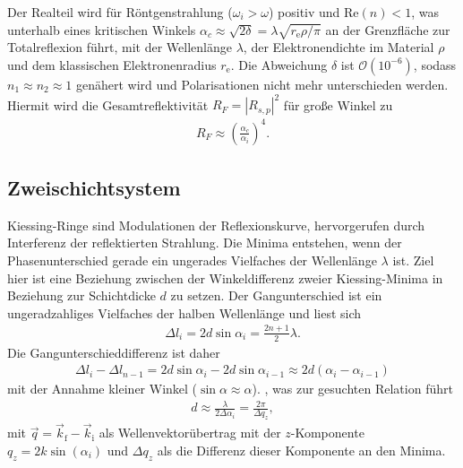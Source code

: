Der Realteil wird für Röntgenstrahlung ($\omega_i >\omega$) positiv und $\text{Re}(n)<1$, was
unterhalb eines kritischen Winkels $\alpha_c\approx \sqrt{2\delta}=\lambda\sqrt{r_\text{e}\rho /\pi}$ an der Grenzfläche zur Totalreflexion führt, mit
der Wellenlänge $\lambda$, der Elektronendichte im Material $\rho$ und dem klassischen Elektronenradius $r_\text{e}$. Die Abweichung $\delta$ ist 
$\mathcal{O}(10^{-6})$, sodass 
$n_1 \approx n_2 \approx 1$ genähert wird und Polarisationen nicht mehr unterschieden werden. Hiermit wird die Gesamtreflektivität $R_F = |R_{s,p}|^2$ für
große Winkel zu
\begin{align}
 R_F \approx \left(\frac{\alpha_c}{\alpha_i}\right)^4.
\end{align}

\subsection{Zweischichtsystem}
Kiessing-Ringe sind Modulationen der Reflexionskurve, hervorgerufen durch Interferenz der reflektierten Strahlung. Die Minima entstehen, wenn der 
Phasenunterschied gerade ein ungerades Vielfaches der Wellenlänge $\lambda$ ist. Ziel hier ist eine Beziehung zwischen der Winkeldifferenz zweier Kiessing-Minima 
in Beziehung zur Schichtdicke $d$ zu setzen. Der Gangunterschied ist ein ungeradzahliges Vielfaches der halben Wellenlänge und liest sich
\begin{align}
 \Delta l_i = 2 d \sin\alpha_i = \frac{2n+1}{2}\lambda.
\end{align}
Die Gangunterschieddifferenz ist daher
\begin{align}
 \Delta l_i -\Delta l_{n-1}= 2 d \sin\alpha_i - 2d\sin\alpha_{i-1} \approx 2d (\alpha_i - \alpha_{i-1})
\end{align}
mit der Annahme kleiner Winkel ($\sin\alpha \approx \alpha$).  , was zur
gesuchten Relation führt
\begin{align}
 d \approx \frac{\lambda}{2\Delta\alpha_i} = \frac{2\pi}{\Delta q_z},
\end{align}
mit $\vec q = \vec k_\text{f} - \vec k_\text{i}$ als Wellenvektorübertrag mit der $z$-Komponente $q_z = 2k\sin(\alpha_i)$ und $\Delta q_z$ als die Differenz dieser 
Komponente an den Minima.

